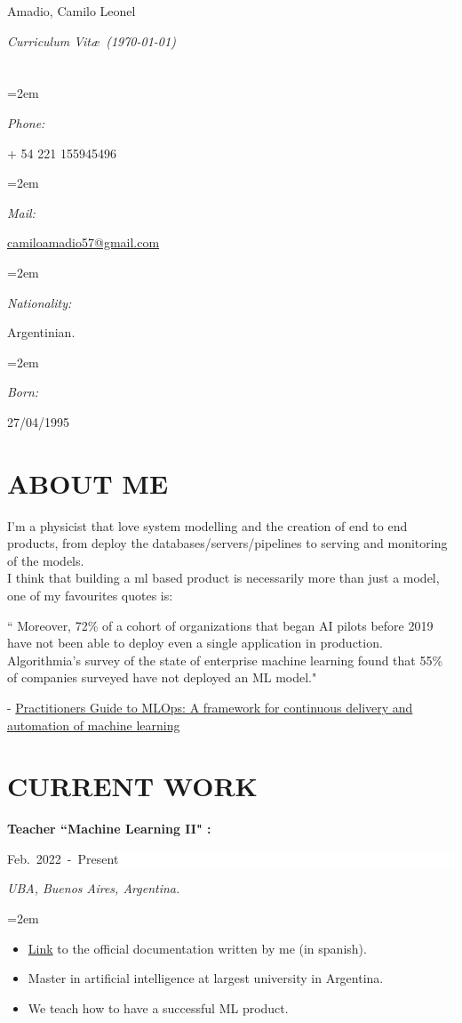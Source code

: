 \documentclass[paper=letter,fontsize=11pt]{scrartcl} %
\newlength{\spacebox}
\newcommand{\sepspace}{\vspace*{1em}}		%
\newcommand{\MyName}[1]{ %
		\Huge \usefont{OT1}{phv}{b}{n} \hfill #1
		\par \normalsize \normalfont}
\newcommand{\MySlogan}[1]{ %
		\large \usefont{OT1}{phv}{m}{n}\hfill \textit{#1}
		\par \normalsize \normalfont}
\newcommand{\NewPart}[2]{\section*{\uppercase{#1} \small \normalfont #2}}
\newcommand{\PersonalEntry}[2]{\small
		\noindent\hangindent=2em\hangafter=0 %
		\parbox{\spacebox}{        %
		\textit{#1}}		       %
		\small\hspace{1.5em} #2 \par}    %
\newcommand{\WorkEntry}[5]{
		\noindent \textbf{#1}
        \noindent \small \textit{#2}
        \hfill      %
        \colorbox{White}{%
			\parbox{6em}{%
			\hfill\color{Black}#3}} \par  %
		\noindent \textit{#4} \par        %
		\noindent\hangindent=2em\hangafter=0 \small #5 %
		\normalsize \par}
\begin{document}

\MyName{Amadio, Camilo Leonel}
\MySlogan{Curriculum Vit\ae\ (\today)}

\sepspace
\sepspace
\sepspace
\NewPart{}{}

\PersonalEntry{Phone:}{+ 54 221 155945496}
\PersonalEntry{Mail:}{\href{mailto:camiloamadio57@gmail.com}{camiloamadio57@gmail.com}}
\PersonalEntry{Nationality:}{Argentinian.}
\PersonalEntry{Born:}{27/04/1995}


\NewPart{About me}{}

\sepspace

I'm a physicist that love system modelling and the creation of end to end products, from deploy the databases/servers/pipelines to serving and monitoring of the models. 
\\


I think that building a ml based product is necessarily more than just a model, one of my favourites quotes is:

`` Moreover, 72\% of a cohort of organizations that began AI pilots before 2019 have not
been able to deploy even a single application in production.
 Algorithmia’s survey of the state of enterprise machine
learning found that 55\% of companies surveyed have not deployed an ML model."

- \href{https://cloud.google.com/resources/mlops-whitepaper?hl=es}{Practitioners Guide to MLOps: A framework for continuous delivery and automation of machine learning}


\NewPart{Current work}{}

\sepspace




\WorkEntry{Teacher ``Machine Learning II" :}
{}{\hbox{Feb. 2022 - Present}}
{UBA, Buenos Aires, Argentina.}
{
\begin{itemize}
	\item \href{https://docs.google.com/document/d/1OxThFRjgF_6rssui72ZJRAYMpe7QeRiKPYT9XMUfbI8/edit?usp=sharing}{Link} to the official documentation  written by me (in spanish).
	\item Master in artificial intelligence at largest university in Argentina.
	\item We teach how to have a successful ML product.
\end{itemize}
}
\end{document}
